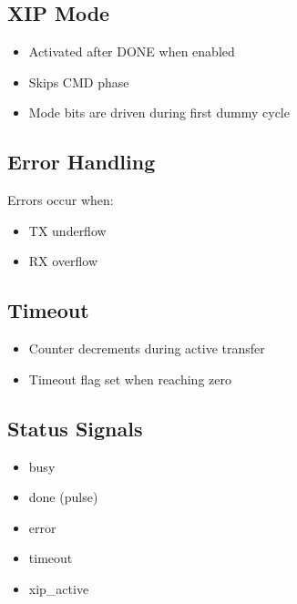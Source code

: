 \subsection{XIP Mode}

\begin{itemize}
  \item Activated after DONE when enabled
  \item Skips CMD phase
  \item Mode bits are driven during first dummy cycle
\end{itemize}

\subsection{Error Handling}

Errors occur when:
\begin{itemize}
  \item TX underflow
  \item RX overflow
\end{itemize}

\subsection{Timeout}

\begin{itemize}
  \item Counter decrements during active transfer
  \item Timeout flag set when reaching zero
\end{itemize}

\subsection{Status Signals}

\begin{itemize}
  \item busy
  \item done (pulse)
  \item error
  \item timeout
  \item xip\_active
\end{itemize}